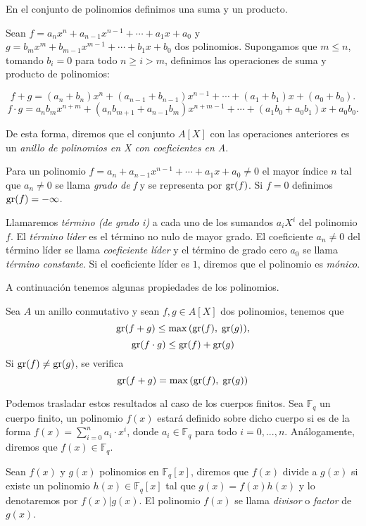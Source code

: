En el conjunto de polinomios definimos una suma y un producto. 

Sean $f = a_n x^n + a_{n-1} x^{n-1} + \cdots + a_1 x + a_0$ y $g = b_m x^m + b_{m-1} x^{m-1} + \cdots + b_1 x + b_0$ dos polinomios. Supongamos que $m \leq n$, tomando $b_i = 0$ para todo $n \geq i > m$, definimos las operaciones de suma y producto de polinomios:

$$f + g = (a_n + b_n)x^n + (a_{n-1} + b_{n-1})x^{n-1} + \cdots + (a_1 + b_1)x + (a_0 + b_0).$$
$$f \cdot g = a_n b_m x^{n+m} + (a_n b_{m+1} + a_{n-1} b_m) x^{n+m-1} + \cdots + (a_1 b_0 + a_0 b_1)x + a_0 b_0.$$

De esta forma, diremos que el conjunto $A[X]$ con las operaciones anteriores es un \emph{anillo de polinomios en X con coeficientes en A}.

\begin{definition}
    Para un polinomio $f = a_n + a_{n-1} x^{n-1} + \cdots + a_1 x + a_0 \neq 0$ el mayor índice $n$ tal que $a_n \neq 0$ se llama \emph{grado de f} y se representa por $\operatorname{gr}(f)$. Si $f = 0$ definimos $\operatorname{gr}(f) = - \infty$.

    Llamaremos \emph{término (de grado i)} a cada uno de los sumandos $a_i X^i$ del polinomio $f$. El \emph{término líder} es el término no nulo de mayor grado. El coeficiente $a_n \neq 0$ del término líder se llama \emph{coeficiente líder} y el término de grado cero $a_0$ se llama \emph{término constante}. Si el coeficiente líder es $1$, diremos que el polinomio es \emph{mónico}.
\end{definition}

A continuación tenemos algunas propiedades de los polinomios.

\begin{proposition}
    Sea $A$ un anillo conmutativo y sean $f,g \in A[X]$ dos polinomios, tenemos que 
    $$\operatorname{gr}(f + g) \leq \max{(\operatorname{gr}(f), \; \operatorname{gr}(g))},$$
    $$\operatorname{gr}(f \cdot g) \leq \operatorname{gr}(f) + \operatorname{gr}(g)$$
    Si $\operatorname{gr}(f) \neq \operatorname{gr}(g)$, se verifica 
    $$\operatorname{gr}(f + g) = \max{(\operatorname{gr}(f), \; \operatorname{gr}(g))}$$
\end{proposition}

Podemos trasladar estos resultados al caso de los cuerpos finitos. Sea $\mathbb{F}_q$ un cuerpo finito, un polinomio $f(x)$ estará definido sobre dicho cuerpo si es de la forma $f(x) = \sum_{i = 0}^{n} a_i \cdot x^i$, donde $a_i \in \mathbb{F}_q$ para todo $i = 0, ..., n$. Análogamente, diremos que $f(x) \in \mathbb{F}_q$.

Sean $f(x)$ y $g(x)$ polinomios en $\mathbb{F}_q[x]$, diremos que $f(x)$ divide a $g(x)$ si existe un polinomio $h(x) \in \mathbb{F}_q[x]$ tal que $g(x) = f(x) h(x)$ y lo denotaremos por $f(x) \vert g(x)$. El polinomio $f(x)$ se llama \emph{divisor} o \emph{factor} de $g(x)$.

